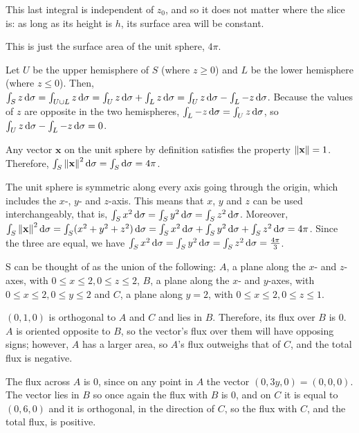 This last integral is independent of $z_0$, and so it does not matter where the slice is: as long as its height is $h$, its surface area will be constant.


This is just the surface area of the unit sphere, $4\pi$.

Let $U$ be the upper hemisphere of $S$ (where $z \geq 0$) and $L$ be the lower hemisphere (where $z \leq 0$). Then, $\int_S z \mathop{}\!\mathrm{d} \sigma = \int_{U \cup L} z \mathop{}\!\mathrm{d} \sigma = \int_U z \mathop{}\!\mathrm{d} \sigma + \int_L z \mathop{}\!\mathrm{d} \sigma = \int_U z \mathop{}\!\mathrm{d} \sigma - \int_L -z \mathop{}\!\mathrm{d} \sigma$. Because the values of $z$ are opposite in the two hemispheres, $\int_L -z \mathop{}\!\mathrm{d} \sigma = \int_U z \mathop{}\!\mathrm{d} \sigma$, so $\int_U z \mathop{}\!\mathrm{d} \sigma - \int_L -z \mathop{}\!\mathrm{d} \sigma = 0$.

Any vector $\mathbf{x}$ on the unit sphere by definition satisfies the property $\left\lVert\mathbf{x}\right\rVert = 1$. Therefore, $\int_S \left\lVert\mathbf{x}\right\rVert^2 \mathop{}\!\mathrm{d} \sigma = \int_S \mathop{}\!\mathrm{d} \sigma = 4\pi$.

The unit sphere is symmetric along every axis going through the origin, which includes the $x$-, $y$- and $z$-axis. This means that $x$, $y$ and $z$ can be used interchangeably, that is, $\int_S x^2 \mathop{}\!\mathrm{d} \sigma = \int_S y^2 \mathop{}\!\mathrm{d} \sigma = \int_S z^2 \mathop{}\!\mathrm{d} \sigma$. Moreover, $\int_S \left\lVert\mathbf{x}\right\rVert^2 \mathop{}\!\mathrm{d} \sigma = \int_S (x^2 + y^2 + z^2) \mathop{}\!\mathrm{d} \sigma = \int_S x^2 \mathop{}\!\mathrm{d} \sigma + \int_S y^2 \mathop{}\!\mathrm{d} \sigma + \int_S z^2 \mathop{}\!\mathrm{d} \sigma = 4\pi$. Since the three are equal, we have $\int_S x^2 \mathop{}\!\mathrm{d} \sigma = \int_S y^2 \mathop{}\!\mathrm{d} \sigma = \int_S z^2 \mathop{}\!\mathrm{d} \sigma = \frac{4\pi}{3}$.


S can be thought of as the union of the following: $A$, a plane along the $x$- and $z$-axes, with $0 \leq x \leq 2, 0 \leq z \leq 2$, $B$, a plane along the $x$- and $y$-axes, with $0 \leq x \leq 2, 0 \leq y \leq 2$ and $C$, a plane along $y = 2$, with $0 \leq x \leq 2, 0 \leq z \leq 1$.

$(0, 1, 0)$ is orthogonal to $A$ and $C$ and lies in $B$. Therefore, its flux over $B$ is 0. $A$ is oriented opposite to $B$, so the vector's flux over them will have opposing signs; however, $A$ has a larger area, so $A$'s flux outweighs that of $C$, and the total flux is negative.

The flux across $A$ is 0, since on any point in $A$ the vector $(0, 3y, 0) = (0, 0, 0)$. The vector lies in $B$ so once again the flux with $B$ is 0, and on $C$ it is equal to $(0, 6, 0)$ and it is orthogonal, in the direction of $C$, so the flux with $C$, and the total flux, is positive.

